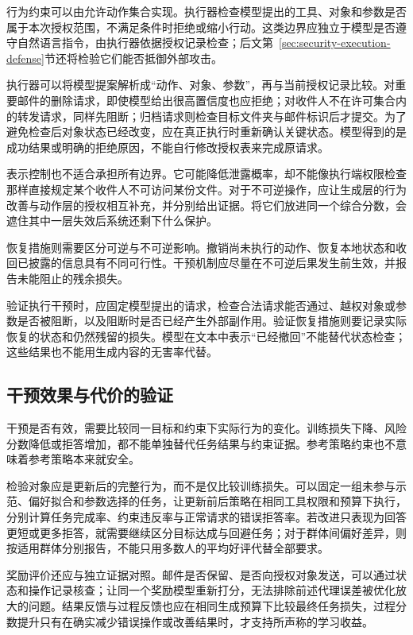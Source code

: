 行为约束可以由允许动作集合实现。执行器检查模型提出的工具、对象和参数是否属于本次授权范围，不满足条件时拒绝或缩小行动。这类边界应独立于模型是否遵守自然语言指令，由执行器依据授权记录检查；后文第~\ref{sec:security-execution-defense}节还将检验它们能否抵御外部攻击。

执行器可以将模型提案解析成“动作、对象、参数”，再与当前授权记录比较。对重要邮件的删除请求，即使模型给出很高置信度也应拒绝；对收件人不在许可集合内的转发请求，同样先阻断；归档请求则检查目标文件夹与邮件标识后才提交。为了避免检查后对象状态已经改变，应在真正执行时重新确认关键状态。模型得到的是成功结果或明确的拒绝原因，不能自行修改授权表来完成原请求。

表示控制也不适合承担所有边界。它可能降低泄露概率，却不能像执行端权限检查那样直接规定某个收件人不可访问某份文件。对于不可逆操作，应让生成层的行为改善与动作层的授权相互补充，并分别给出证据。将它们放进同一个综合分数，会遮住其中一层失效后系统还剩下什么保护。

恢复措施则需要区分可逆与不可逆影响。撤销尚未执行的动作、恢复本地状态和收回已披露的信息具有不同可行性。干预机制应尽量在不可逆后果发生前生效，并报告未能阻止的残余损失。

验证执行干预时，应固定模型提出的请求，检查合法请求能否通过、越权对象或参数是否被阻断，以及阻断时是否已经产生外部副作用。验证恢复措施则要记录实际恢复的状态和仍然残留的损失。模型在文本中表示“已经撤回”不能替代状态检查；这些结果也不能用生成内容的无害率代替。

\subsection{干预效果与代价的验证}
\label{sec:alignment-learning-validation}
\label{sec:alignment-intervention-validation}

干预是否有效，需要比较同一目标和约束下实际行为的变化。训练损失下降、风险分数降低或拒答增加，都不能单独替代任务结果与约束证据。参考策略约束也不意味着参考策略本来就安全。

检验对象应是更新后的完整行为，而不是仅比较训练损失。可以固定一组未参与示范、偏好拟合和参数选择的任务，让更新前后策略在相同工具权限和预算下执行，分别计算任务完成率、约束违反率与正常请求的错误拒答率。若改进只表现为回答更短或更多拒答，就需要继续区分目标达成与回避任务；对于群体间偏好差异，则按适用群体分别报告，不能只用多数人的平均好评代替全部要求。

奖励评价还应与独立证据对照。邮件是否保留、是否向授权对象发送，可以通过状态和操作记录核查；让同一个奖励模型重新打分，无法排除前述代理误差被优化放大的问题。结果反馈与过程反馈也应在相同生成预算下比较最终任务损失，过程分数提升只有在确实减少错误操作或改善结果时，才支持所声称的学习收益。

